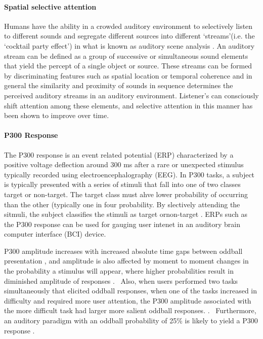 \documentclass[12pt]{article}
\begin{document}
\maketitle

   
\paragraph{Spatial selective attention} 
Humans have the ability in a crowded auditory environment to
selectively listen to different sounds and segregate different
sources into different \lq streams\rq (i.e. the \lq cocktail
party effect\rq) in what is known as auditory scene analysis
\cite{Bregman1994}. An auditory stream can be defined as a group of
successive or simultaneous sound elements that yield the percept of
a single object or source\cite{Moore2012}. These streams can be formed by
discriminating features such as spatial location or
temporal coherence and in general the similarity and proximity of
sounds in sequence determines the perceived auditory streams in an
auditory environment\cite{Bregman1994}.  Listener's can consciously
shift attention among these elements, and selective attention in
this manner has been shown to improve over time\cite{Best2008}.

\paragraph{P300 Response} 
The P300 response is an event related
potential (ERP) characterized by a positive voltage deflection
around 300 ms after a rare or unexpected stimulus typically recorded
using electroencephalography (EEG). In P300 tasks, a subject is
typically presented with a series of stimuli that fall into one of
two classes target or non-target.  The target class must ahve lower
probability of occurring than the other (typically one in four
probability.  By slectively attending the sitmuli, the subject
classifies the stimuli as target ornon-target \cite{Wolpaw2012}.
ERPs such as the P300 response can be used for gauging user intenet
in an auditory brain computer interface (BCI) device.

P300 amplitude increases with increased absolute
time gaps between oddball presentation \cite{GONSALVEZ2002}, and
amplitude is also affected by moment to moment changes in the
probability a stimulus will appear, where higher probabilities
result in diminished amplitude of responses \cite{Donchin1981}.
 Also, when users performed two tasks simultaneously that elicited
oddball responses, when one of the tasks increased in difficulty and
required more user attention, the P300 amplitude associated with the
more difficult task had larger more salient oddball responses.
\cite{Sirevaag1989}.  Furthermore, an auditory paradigm with an
oddball probability of 25\% is likely to yield a P300 response
\cite{Nijboer2008}. 
\end{document}
